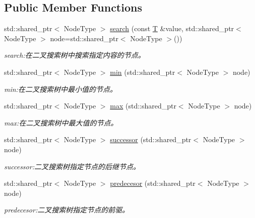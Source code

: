 \subsection*{Public Member Functions}
\begin{DoxyCompactItemize}
\item 
std\+::shared\+\_\+ptr$<$ Node\+Type $>$ \hyperlink{class_introduction_to_algorithm_1_1_tree_algorithm_1_1_search_tree_affaf44d28dc2180f93669cb8d6c09c84}{search} (const \hyperlink{struct_introduction_to_algorithm_1_1_tree_algorithm_1_1_binary_tree_aca34063e8bc88ed0dde8c706c337c3d6}{T} \&value, std\+::shared\+\_\+ptr$<$ Node\+Type $>$ node=std\+::shared\+\_\+ptr$<$ Node\+Type $>$())
\begin{DoxyCompactList}\small\item\em search\+:在二叉搜索树中搜索指定内容的节点。 \end{DoxyCompactList}\item 
std\+::shared\+\_\+ptr$<$ Node\+Type $>$ \hyperlink{class_introduction_to_algorithm_1_1_tree_algorithm_1_1_search_tree_af0bb418896808f72bb1edee55d238d55}{min} (std\+::shared\+\_\+ptr$<$ Node\+Type $>$ node)
\begin{DoxyCompactList}\small\item\em min\+:在二叉搜索树中最小值的节点。 \end{DoxyCompactList}\item 
std\+::shared\+\_\+ptr$<$ Node\+Type $>$ \hyperlink{class_introduction_to_algorithm_1_1_tree_algorithm_1_1_search_tree_a2dfe32f3914b03ccdb22f88f24a6afdd}{max} (std\+::shared\+\_\+ptr$<$ Node\+Type $>$ node)
\begin{DoxyCompactList}\small\item\em max\+:在二叉搜索树中最大值的节点。 \end{DoxyCompactList}\item 
std\+::shared\+\_\+ptr$<$ Node\+Type $>$ \hyperlink{class_introduction_to_algorithm_1_1_tree_algorithm_1_1_search_tree_a9d53e1f0b130263f2974dced515aa1f1}{successor} (std\+::shared\+\_\+ptr$<$ Node\+Type $>$ node)
\begin{DoxyCompactList}\small\item\em successor\+:二叉搜索树指定节点的后继节点。 \end{DoxyCompactList}\item 
std\+::shared\+\_\+ptr$<$ Node\+Type $>$ \hyperlink{class_introduction_to_algorithm_1_1_tree_algorithm_1_1_search_tree_a0e767d97590d19c97d595708d4419fe1}{predecesor} (std\+::shared\+\_\+ptr$<$ Node\+Type $>$ node)
\begin{DoxyCompactList}\small\item\em predecesor\+:二叉搜索树指定节点的前驱。 \end{DoxyCompactList}\item 

\end{DoxyCompactItemize}
